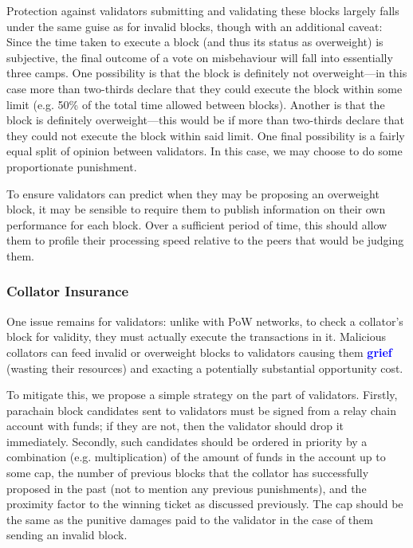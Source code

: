 \documentclass[t,usepdftitle=false]{beamer}
\makeatletter
\newcommand*\eg{e.g.\@\xspace}
\renewcommand{\textit}[1]{\textcolor{blue}{\textbf{#1}}}
\makeatother
\begin{document}
\begin{frame}
Protection against validators submitting and validating these blocks largely falls under the same guise as for invalid blocks, though with an additional caveat: Since the time taken to execute a block (and thus its status as overweight) is subjective, the final outcome of a vote on misbehaviour will fall into essentially three camps. One possibility is that the block is definitely not overweight---in this case more than two-thirds declare that they could execute the block within some limit (\eg 50\% of the total time allowed between blocks). Another is that the block is definitely overweight---this would be if more than two-thirds declare that they could not execute the block within said limit. One final possibility is a fairly equal split of opinion between validators. In this case, we may choose to do some proportionate punishment.

To ensure validators can predict when they may be proposing an overweight block, it may be sensible to require them to publish information on their own performance for each block. Over a sufficient period of time, this should allow them to profile their processing speed relative to the peers that would be judging them.

\subsubsection{Collator Insurance}

 One issue remains for validators: unlike with PoW networks, to check a collator's block for validity, they must actually execute the transactions in it. Malicious collators
can feed invalid or overweight blocks to validators causing them \textit{grief} (wasting their resources) and exacting a potentially substantial opportunity cost.

 To mitigate this, we propose a simple strategy on the part of validators. Firstly, parachain block candidates sent to validators must be signed from a relay chain account with funds; if they are not, then the validator should drop it immediately. Secondly, such candidates should be ordered in priority by a combination (\eg multiplication) of the amount of funds in the account up to some cap, the number of previous blocks that the collator has successfully proposed in the past (not to mention any previous punishments), and the proximity factor to the winning ticket as discussed previously. The cap should be the same as the punitive damages paid to the validator in the case of them sending an invalid block.


\end{frame}
\end{document}
